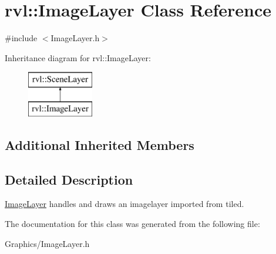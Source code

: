 \hypertarget{classrvl_1_1_image_layer}{}\section{rvl\+:\+:Image\+Layer Class Reference}
\label{classrvl_1_1_image_layer}


{\ttfamily \#include $<$Image\+Layer.\+h$>$}

Inheritance diagram for rvl\+:\+:Image\+Layer\+:\begin{figure}[H]
\begin{center}
\leavevmode
\includegraphics[height=2.000000cm]{classrvl_1_1_image_layer}
\end{center}
\end{figure}
\subsection*{Additional Inherited Members}


\subsection{Detailed Description}
\hyperlink{classrvl_1_1_image_layer}{Image\+Layer} handles and draws an imagelayer imported from tiled. 

The documentation for this class was generated from the following file\+:\begin{DoxyCompactItemize}
\item 
Graphics/Image\+Layer.\+h\end{DoxyCompactItemize}
